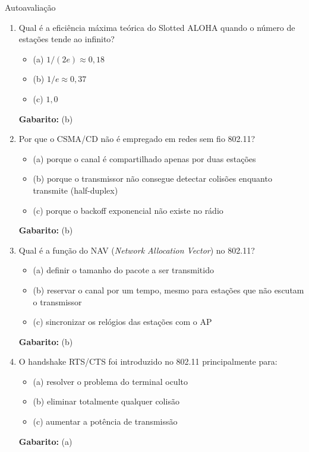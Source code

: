 \documentclass[aspectratio=169,11pt]{beamer}
\begin{document}
\begin{frame}{Autoavaliação}
  \begin{enumerate}
    \item Qual é a eficiência máxima teórica do Slotted ALOHA quando o número de estações tende ao infinito?
      \begin{itemize}
        \item (a) $1/(2e) \approx 0{,}18$
        \item (b) $1/e \approx 0{,}37$
        \item (c) $1{,}0$
      \end{itemize}
      \pause
      \textbf{Gabarito:} (b)
    \item Por que o CSMA/CD não é empregado em redes sem fio 802.11?
      \begin{itemize}
        \item (a) porque o canal é compartilhado apenas por duas estações
        \item (b) porque o transmissor não consegue detectar colisões enquanto transmite (half-duplex)
        \item (c) porque o backoff exponencial não existe no rádio
      \end{itemize}
      \pause
      \textbf{Gabarito:} (b)
    \item Qual é a função do NAV (\emph{Network Allocation Vector}) no 802.11?
      \begin{itemize}
        \item (a) definir o tamanho do pacote a ser transmitido
        \item (b) reservar o canal por um tempo, mesmo para estações que não escutam o transmissor
        \item (c) sincronizar os relógios das estações com o AP
      \end{itemize}
      \pause
      \textbf{Gabarito:} (b)
    \item O handshake RTS/CTS foi introduzido no 802.11 principalmente para:
      \begin{itemize}
        \item (a) resolver o problema do terminal oculto
        \item (b) eliminar totalmente qualquer colisão
        \item (c) aumentar a potência de transmissão
      \end{itemize}
      \pause
      \textbf{Gabarito:} (a)
  \end{enumerate}
\end{frame}
\end{document}
